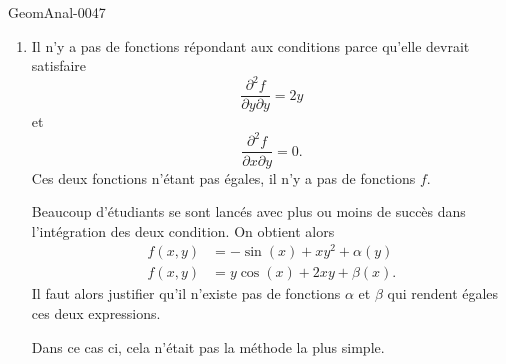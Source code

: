 \begin{corrige}{GeomAnal-0047}

    \begin{enumerate}
        \item
            Il n'y a pas de fonctions répondant aux conditions parce qu'elle devrait satisfaire
            \begin{equation}
                \frac{ \partial^2f  }{ \partial y\partial y }=2y
            \end{equation}
            et
            \begin{equation}
                \frac{ \partial^2f  }{ \partial x\partial y }=0.
            \end{equation}
            Ces deux fonctions n'étant pas égales, il n'y a pas de fonctions \( f\).

            \begin{remark}
                Beaucoup d'étudiants se sont lancés avec plus ou moins de succès dans l'intégration des deux condition. On obtient alors
                \begin{subequations}
                    \begin{align}
                        f(x,y)&=-\sin(x)+xy^2+\alpha(y)\\
                        f(x,y)&=y\cos(x)+2xy+\beta(x).
                    \end{align}
                \end{subequations}
                Il faut alors justifier qu'il n'existe pas de fonctions \( \alpha\) et \( \beta\) qui rendent égales ces deux expressions.

                Dans ce cas ci, cela n'était pas la méthode la plus simple.
            \end{remark}


\end{enumerate}
\end{corrige}

